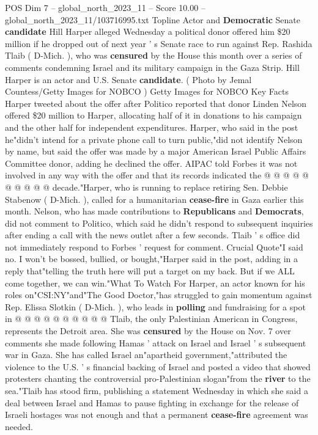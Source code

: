 \begin{textsample}{POS Dim 7 – global\_north\_2023\_11 – Score 10.00 – global\_north\_2023\_11/103716995.txt}  \label{ex:f7_pos_128}
Topline Actor and \textbf{Democratic} Senate \textbf{candidate} Hill Harper alleged Wednesday a political donor offered him \$20 million if he dropped out of next year ' s Senate race to run against Rep.
Rashida Tlaib ( D-Mich. ), who was \textbf{censured} by the House this month over a series of comments condemning Israel and its military campaign in the Gaza Strip.
Hill Harper is an actor and U.S.
Senate \textbf{candidate}. ( Photo by Jemal Countess/Getty Images for NOBCO ) Getty Images for NOBCO Key Facts Harper tweeted about the offer after Politico reported that donor Linden Nelson offered \$20 million to Harper, allocating half of it in donations to his campaign and the other half for independent expenditures.
Harper, who said in the post he"didn't intend for a private phone call to turn public,"did not identify Nelson by name, but said the offer was made by a major American Israel Public Affairs Committee donor, adding he declined the offer.
AIPAC told Forbes it was not involved in any way with the offer and that its records indicated the @ @ @ @ @ @ @ @ @ @ decade."Harper, who is running to replace retiring Sen.
Debbie Stabenow ( D-Mich. ), called for a humanitarian \textbf{cease-fire} in Gaza earlier this month.
Nelson, who has made contributions to \textbf{Republicans} and \textbf{Democrats}, did not comment to Politico, which said he didn't respond to subsequent inquiries after ending a call with the news outlet after a few seconds.
Tlaib ' s office did not immediately respond to Forbes ' request for comment.
Crucial Quote"I said no.
I won't be bossed, bullied, or bought,"Harper said in the post, adding in a reply that"telling the truth here will put a target on my back.
But if we ALL come together, we can win."What To Watch For Harper, an actor known for his roles on"CSI:NY"and"The Good Doctor,"has struggled to gain momentum against Rep.
Elissa Slotkin ( D-Mich. ), who leads in \textbf{polling} and fundraising for a spot in @ @ @ @ @ @ @ @ @ @ Tlaib, the only Palestinian American in Congress, represents the Detroit area.
She was \textbf{censured} by the House on Nov. 7 over comments she made following Hamas ' attack on Israel and Israel ' s subsequent war in Gaza.
She has called Israel an"apartheid government,"attributed the violence to the U.S. ' s financial backing of Israel and posted a video that showed protesters chanting the controversial pro-Palestinian slogan"from the \textbf{river} to the sea."Tlaib has stood firm, publishing a statement Wednesday in which she said a deal between Israel and Hamas to pause fighting in exchange for the release of Israeli hostages was not enough and that a permanent \textbf{cease-fire} agreement was needed.

\end{textsample}
